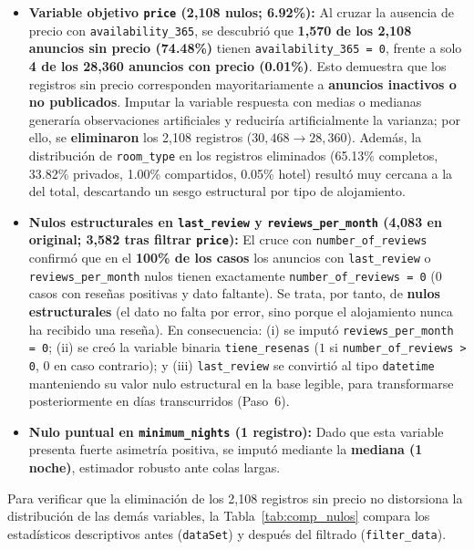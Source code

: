 \documentclass[12pt,letterpaper,oneside]{report}
\begin{document}
\begin{itemize}[leftmargin=1.5em]
  \item \textbf{Variable objetivo \texttt{price} (2,108 nulos; 6.92\%):} Al cruzar la ausencia de precio con \texttt{availability\_365}, se descubrió que \textbf{1,570 de los 2,108 anuncios sin precio (74.48\%)} tienen \texttt{availability\_365 = 0}, frente a solo \textbf{4 de los 28,360 anuncios con precio (0.01\%)}. Esto demuestra que los registros sin precio corresponden mayoritariamente a \textbf{anuncios inactivos o no publicados}. Imputar la variable respuesta con medias o medianas generaría observaciones artificiales y reduciría artificialmente la varianza; por ello, se \textbf{eliminaron} los 2,108 registros ($30{,}468 \rightarrow 28{,}360$). Además, la distribución de \texttt{room\_type} en los registros eliminados (65.13\% completos, 33.82\% privados, 1.00\% compartidos, 0.05\% hotel) resultó muy cercana a la del total, descartando un sesgo estructural por tipo de alojamiento.
  \item \textbf{Nulos estructurales en \texttt{last\_review} y \texttt{reviews\_per\_month} (4,083 en original; 3,582 tras filtrar \texttt{price}):} El cruce con \texttt{number\_of\_reviews} confirmó que en el \textbf{100\% de los casos} los anuncios con \texttt{last\_review} o \texttt{reviews\_per\_month} nulos tienen exactamente \texttt{number\_of\_reviews = 0} (0 casos con reseñas positivas y dato faltante). Se trata, por tanto, de \textbf{nulos estructurales} (el dato no falta por error, sino porque el alojamiento nunca ha recibido una reseña). En consecuencia: (i) se imputó \texttt{reviews\_per\_month = 0}; (ii) se creó la variable binaria \texttt{tiene\_resenas} ($1$ si \texttt{number\_of\_reviews > 0}, $0$ en caso contrario); y (iii) \texttt{last\_review} se convirtió al tipo \texttt{datetime} manteniendo su valor nulo estructural en la base legible, para transformarse posteriormente en días transcurridos (Paso~6).
  \item \textbf{Nulo puntual en \texttt{minimum\_nights} (1 registro):} Dado que esta variable presenta fuerte asimetría positiva, se imputó mediante la \textbf{mediana (1 noche)}, estimador robusto ante colas largas.
\end{itemize}

Para verificar que la eliminación de los 2,108 registros sin precio no distorsiona la distribución de las demás variables, la Tabla~\ref{tab:comp_nulos} compara los estadísticos descriptivos antes (\texttt{dataSet}) y después del filtrado (\texttt{filter\_data}).
\end{document}
